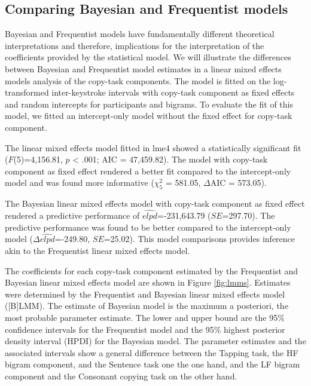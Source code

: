 \documentclass[,man,floatsintext]{apa6}
\begin{document}
\begin{appendix}
\hypertarget{comparing-bayesian-and-frequentist-models}{%
\section{Comparing Bayesian and Frequentist
models}\label{comparing-bayesian-and-frequentist-models}}

Bayesian and Frequentist models have fundamentally different theoretical
interpretations and therefore, implications for the interpretation of
the coefficients provided by the statistical model. We will illustrate
the differences between Bayesian and Frequentist model estimates in a
linear mixed effects models analysis of the copy-task components. The
model is fitted on the log-transformed inter-keystroke intervals with
copy-task component as fixed effects and random intercepts for
participants and bigrams. To evaluate the fit of this model, we fitted
an intercept-only model without the fixed effect for copy-task
component.

The linear mixed effects model fitted in lme4 showed a statistically
significant fit (\(F\)(5)=4,156.81, \(p\) \textless{} .001; AIC =
47,459.82). The model with copy-task component as fixed effect rendered
a better fit compared to the intercept-only model and was found more
informative (\(\chi^2_5\) = 581.05, \(\Delta\)AIC = 573.05).

The Bayesian linear mixed effects model with copy-task component as
fixed effect rendered a predictive performance of
\(\widehat{elpd}\)=-231,643.79 (\(SE\)=297.70). The predictive
performance was found to be better compared to the intercept-only model
(\(\Delta\widehat{elpd}\)=-249.80, \(SE\)=25.02). This model comparisons
provides inference akin to the Frequentist linear mixed effects model.

The coefficients for each copy-task component estimated by the
Frequentist and Bayesian linear mixed effects model are shown in Figure
\ref{fig:lmms}. Estimates were determined by the Frequentist and
Bayesian linear mixed effects model ({[}B{]}LMM). The estimate of
Bayesian model is the maximum a posteriori, the most probable parameter
estimate. The lower and upper bound are the 95\% confidence intervals
for the Frequentist model and the 95\% highest posterior density
interval (HPDI) for the Bayesian model. The parameter estimates and the
associated intervals show a general difference between the Tapping task,
the HF bigram component, and the Sentence task one the one hand, and the
LF bigram component and the Consonant copying task on the other hand.


\end{appendix}
\end{document}
